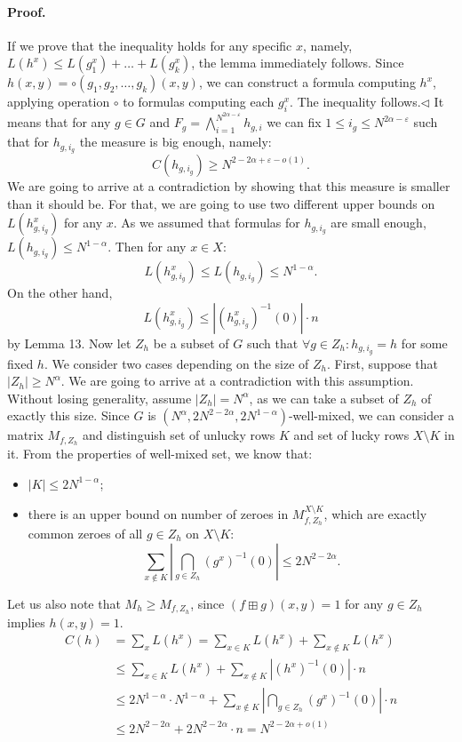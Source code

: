\paragraph{Proof.} If we prove that the inequality holds for any specific $x$, namely, $L(h^x)\leq L(g_1^x)+\ldots+L(g_k^x)$, the lemma immediately follows.
Since $h(x,y)=\circ(g_1,g_2,\ldots,g_k)(x,y)$, we can construct a formula computing $h^x$, applying operation $\circ$ to formulas computing each $g_i^x$. The inequality follows.\hfill$\triangleleft$
It means that for any $g\in G$ and $F_g=\bigwedge_{i=1}^{N^{2\alpha-\varepsilon}}h_{g,i}$ we can fix $1\leq i_g\leq N^{2\alpha-\varepsilon}$ such that for $h_{g,i_g}$ the measure is big enough, namely:
\[C(h_{g,i_g})\geq N^{2-2\alpha+\varepsilon-o(1)}.\]
We are going to arrive at a contradiction by showing that this measure is smaller than it should be. For that, we are going to use two different upper bounds on $L(h_{g,i_g}^x)$ for any $x$. As we assumed that formulas for $h_{g,i_g}$ are small enough, $L(h_{g,i_g})\leq N^{1-\alpha}$. Then for any $x\in X$:
\[L(h_{g,i_g}^x)\leq L(h_{g,i_g})\leq N^{1-\alpha}.\]
On the other hand,
\[L(h_{g,i_g}^x)\leq|(h_{g,i_g}^x)^{-1}(0)|\cdot n\]
by Lemma 13.
Now let $Z_h$ be a subset of $G$ such that $\forall g\in Z_h:h_{g,i_g}=h$ for some fixed $h$.
We consider two cases depending on the size of $Z_h$. First, suppose that $|Z_h|\geq N^\alpha$. We are going to arrive at a contradiction with this assumption. Without losing generality, assume $|Z_h|=N^\alpha$, as we can take a subset of $Z_h$ of exactly this size. Since $G$ is $(N^\alpha,2N^{2-2\alpha},2N^{1-\alpha})$-well-mixed, we can consider a matrix $M_{f,Z_h}$ and distinguish set of unlucky rows $K$ and set of lucky rows $X\setminus K$ in it.
From the properties of well-mixed set, we know that:
\begin{itemize}
\item $|K|\leq2N^{1-\alpha}$;
\item there is an upper bound on number of zeroes in $M_{f,Z_h}^{X\setminus K}$, which are exactly common zeroes of all $g\in Z_h$ on $X\setminus K$:
\[\sum_{x\notin K}\left|\bigcap_{g\in Z_h}(g^x)^{-1}(0)\right|\leq2N^{2-2\alpha}.\]
\end{itemize}
Let us also note that $M_h\geq M_{f,Z_h}$, since $(f\boxplus g)(x,y)=1$ for any $g\in Z_h$ implies $h(x,y)=1$.
\begin{align*}
C(h)&=\sum_xL(h^x)=\sum_{x\in K}L(h^x)+\sum_{x\notin K}L(h^x)\\
&\leq\sum_{x\in K}L(h^x)+\sum_{x\notin K}|(h^x)^{-1}(0)|\cdot n\\
&\leq2N^{1-\alpha}\cdot N^{1-\alpha}+\sum_{x\notin K}\left|\bigcap_{g\in Z_h}(g^x)^{-1}(0)\right|\cdot n\\
&\leq2N^{2-2\alpha}+2N^{2-2\alpha}\cdot n=N^{2-2\alpha+o(1)}
\end{align*}
